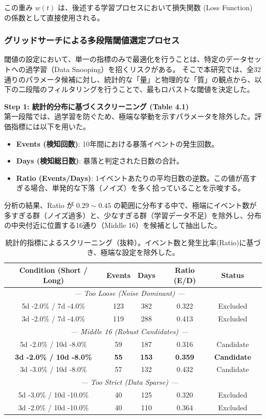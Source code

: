\documentclass[11pt,a4paper,oneside]{ltjsarticle}
\begin{document}
この重み $w(t)$ は、後述する学習プロセスにおいて損失関数 (Loss Function) の係数として直接使用される。

\subsubsection{グリッドサーチによる多段階閾値選定プロセス}
閾値の設定において、単一の指標のみで最適化を行うことは、特定のデータセットへの過学習（Data Snooping）を招くリスクがある。
そこで本研究では、全32通りのパラメータ候補に対し、統計的な「量」と物理的な「質」の観点から、以下の二段階のフィルタリングを行うことで、最もロバストな閾値を決定した。

\textbf{Step 1: 統計的分布に基づくスクリーニング (Table 4.1)} \\
第一段階では、過学習を防ぐため、極端な挙動を示すパラメータを除外した。評価指標には以下を用いた。
\begin{itemize}
    \item \textbf{Events (検知回数)}: 10年間における暴落イベントの発生回数。
    \item \textbf{Days (検知総日数)}: 暴落と判定された日数の合計。
    \item \textbf{Ratio (Events/Days)}: 1イベントあたりの平均日数の逆数。この値が高すぎる場合、単発的な下落（ノイズ）を多く拾っていることを示唆する。
\end{itemize}
分析の結果、Ratio が $0.29 \sim 0.45$ の範囲に分布する中で、極端にイベント数が多すぎる群（ノイズ過多）と、少なすぎる群（学習データ不足）を除外し、分布の中央付近に位置する16通り（Middle 16）を候補として抽出した。

\begin{table}[H]
\centering
\caption{統計的指標によるスクリーニング（抜粋）。イベント数と発生比率(Ratio)に基づき、極端な設定を除外した。}
\label{tab:grid_step1}
\small
\begin{tabular}{cccccc}
\hline
Condition (Short / Long) & Events & Days & Ratio (E/D) & Status \\
\hline
\multicolumn{5}{c}{\textit{--- Too Loose (Noise Dominant) ---}} \\
5d -2.0\% / 7d -4.0\% & 123 & 382 & 0.322 & Excluded \\
3d -2.0\% / 7d -4.0\% & 119 & 288 & 0.413 & Excluded \\
\hline
\multicolumn{5}{c}{\textit{--- Middle 16 (Robust Candidates) ---}} \\
5d -2.0\% / 10d -8.0\% & 59 & 187 & 0.316 & Candidate \\
\textbf{3d -2.0\% / 10d -8.0\%} & \textbf{55} & \textbf{153} & \textbf{0.359} & \textbf{Candidate} \\
3d -3.0\% / 10d -8.0\% & 57 & 132 & 0.432 & Candidate \\
\hline
\multicolumn{5}{c}{\textit{--- Too Strict (Data Sparse) ---}} \\
5d -3.0\% / 10d -10.0\% & 40 & 125 & 0.320 & Excluded \\
3d -2.0\% / 10d -10.0\% & 40 & 110 & 0.364 & Excluded \\
\hline
\end{tabular}
\end{table}
\end{document}
